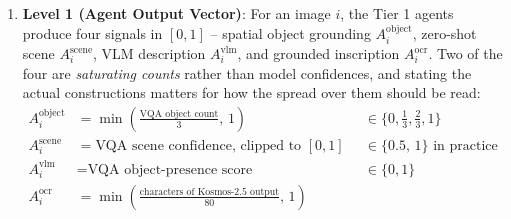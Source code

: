 \documentclass[12pt,a4paper]{report}
\begin{document}
\begin{enumerate}
    \item \textbf{Level 1 (Agent Output Vector)}: For an image $i$, the Tier 1 agents produce four signals in $[0,1]$ -- spatial object grounding $A_i^{\text{object}}$, zero-shot scene $A_i^{\text{scene}}$, VLM description $A_i^{\text{vlm}}$, and grounded inscription $A_i^{\text{ocr}}$. Two of the four are \emph{saturating counts} rather than model confidences, and stating the actual constructions matters for how the spread over them should be read:
\begin{equation*}
\begin{aligned}
A_i^{\text{object}} &= \min\!\left(\tfrac{\text{VQA object count}}{3},\, 1\right) && \in \{0,\tfrac13,\tfrac23,1\} \\
A_i^{\text{scene}}  &= \text{VQA scene confidence, clipped to } [0,1] && \in \{0.5,\,1\} \text{ in practice} \\
A_i^{\text{vlm}}    &= \text{VQA object-presence score} && \in \{0,1\} \\
A_i^{\text{ocr}}    &= \min\!\left(\tfrac{\text{characters of Kosmos-2.5 output}}{80},\, 1\right) &&
\end{aligned}
\end{equation*}

\end{enumerate}
\end{document}
